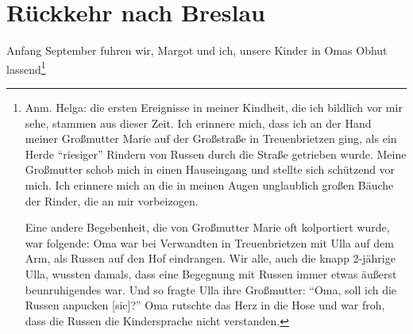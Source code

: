 \documentclass[a5paper,pagesize,10pt,twoside=true]{scrbook}
\renewcommand{\marginpar}[2][]{}
\begin{document}
\section{Rückkehr nach Breslau}

\marginpar{Rückkehr nach Breslau} Anfang September fuhren wir, Margot und ich, unsere Kinder in Omas Obhut lassend\footnote{
	Anm. Helga: die ersten Ereignisse in meiner Kindheit, die ich bildlich vor mir sehe, stammen aus dieser Zeit. Ich erinnere mich, dass ich an der Hand meiner Großmutter Marie auf der Großstraße in Treuenbrietzen ging, als ein Herde \enquote{riesiger} Rindern von Russen durch die Straße getrieben wurde. Meine Großmutter schob mich in einen Hauseingang und stellte sich schützend vor mich. Ich erinnere mich an die in meinen Augen unglaublich großen Bäuche der Rinder, die an mir vorbeizogen.
	
	Eine andere Begebenheit, die von Großmutter Marie oft kolportiert wurde, war folgende: Oma war bei Verwandten in Treuenbrietzen mit Ulla auf dem Arm, als Russen auf den Hof eindrangen. Wir alle, auch die knapp 2-jährige Ulla, wussten damals, dass eine Begegnung mit Russen immer etwas äußerst beunruhigendes war. Und so fragte Ulla ihre Großmutter: \enquote{Oma, soll ich die Russen anpucken [sic]?} Oma rutschte das Herz in die Hose und war froh, dass die Russen die Kindersprache nicht verstanden.
	
}
\end{document}
